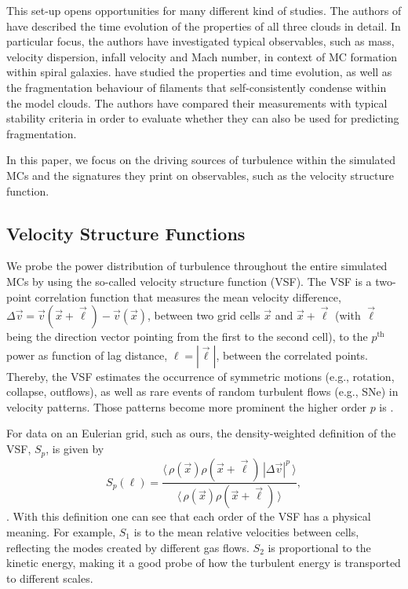 This set-up opens opportunities for many different kind of studies. 
The authors of  have described the time evolution of the properties of all three clouds in detail.
In particular focus, the authors have investigated typical observables, such as mass, velocity dispersion, infall velocity and Mach number, in context of MC formation within spiral galaxies.
 have studied the properties and time evolution, as well as the fragmentation behaviour of filaments that self-consistently condense within the model clouds. 
The authors have compared their measurements with typical stability criteria in order to evaluate whether they can also be used for predicting fragmentation.

In this paper, we focus on the driving sources of turbulence within the simulated MCs and the signatures they print on observables, such as the velocity structure function.


\subsection{Velocity Structure Functions}\label{methods:vsf}

We probe the power distribution of turbulence throughout the entire simulated MCs by using the so-called velocity structure function (VSF).
The VSF is a two-point correlation function that measures the mean velocity difference, $\Delta \vec{v} = \vec{v}(\vec{x}+\vec{\ell}) - \vec{v}(\vec{x})$, between two grid cells $\vec{x}$ and $\vec{x}+\vec{\ell}$ (with $\vec{\ell}$ being the direction vector pointing from the first to the second cell), to the $p^\mathrm{th}$ power as function of lag distance, $\ell = |\vec{\ell}|$, between the correlated points.
Thereby, the VSF estimates the occurrence of symmetric motions (e.g., rotation, collapse, outflows), as well as rare events of random turbulent flows (e.g., SNe) in velocity patterns.
Those patterns become more prominent the higher order $p$ is \citep{Heyer2004}.

For data on an Eulerian grid, such as ours, the density-weighted definition of the VSF, $\mathit{S}_p$, is given by
\begin{equation}
	\mathit{S}_p (\ell) = \frac{\langle \, \rho(\vec{x}) \rho(\vec{x}+\vec{\ell}) \, |\Delta \vec{v}|^p  \, \rangle}{\langle  \, \rho(\vec{x}) \rho(\vec{x}+\vec{\ell}) \, \rangle} ,
    \label{equ:method:def_vsf}
\end{equation}
\citep[and references within]{Padoan2016a}.
With this definition one can see that each order of the VSF has a physical meaning. 
For example, $\mathit{S}_1$ is to the mean relative velocities between cells, reflecting the modes created by different gas flows.
$\mathit{S}_2$ is proportional to the kinetic energy, making it a good probe of how the turbulent energy is transported to different scales.

